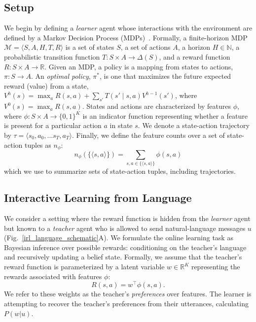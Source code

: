 \documentclass[letterpaper]{article} %
\begin{document}
\subsection{Setup}
We begin by defining a \emph{learner} agent whose interactions with the environment are defined by a Markov Decision Process (MDPs)~\cite{puterman1994markov}.
Formally, a finite-horizon MDP $\mathcal{M} = \langle S, A, H, T, R \rangle$ is a set of states $S$, a set of actions $A$, a horizon $H \in \mathbb{N}$, a probabilistic transition function $T: S \times A \rightarrow \Delta(S)$, and a reward function $R: S \times A \rightarrow \mathbb{R}$. Given an MDP, a policy is a mapping from states to actions, $\pi: S \rightarrow A$.
An \emph{optimal policy}, $\pi^*$, is one that maximizes the future expected reward (value) from a state, $V^h(s) = \max_a R(s, a) + \sum_{s'} T(s' \mid s, a) V^{h - 1}(s')$, where $V^0(s) = \max_a R(s, a)$.
States and actions are characterized by features $\phi$, where $\phi: S \times A \rightarrow \{0, 1\}^{K}$ is an indicator function representing whether a feature is present for a particular action $a$ in state $s$.
We denote a state-action trajectory by $\tau = \langle s_0, a_0, ... s_T, a_T \rangle$. Finally, we define the feature counts over a set of state-action tuples as $n_\phi$:
\begin{equation}
    n_\phi(\{\langle s,a\rangle\}) = \sum_{s,a\in\{\langle s,a\rangle\}}\phi(s,a)
\end{equation}
which we use to summarize sets of state-action tuples, including trajectories.

\subsection{Interactive Learning from Language}
\label{bayesian_lr_section}
We consider a setting where the reward function is hidden from the \emph{learner} agent but known to a \emph{teacher} agent who is allowed to send natural-language messages $u$ (Fig.~\ref{irl_language_schematic}A).
We formulate the online learning task as Bayesian inference over possible rewards: conditioning on the teacher's language and recursively updating a belief state.
Formally, we assume that the teacher's reward function is parameterized by a latent variable $w \in \mathbb{R}^K$ representing the rewards associated with features $\phi$:
\begin{equation}
    R(s,a) = w^{\top}\phi(s, a).
\end{equation}
We refer to these weights as the teacher's \textit{preferences} over features.
The learner is attempting to recover the teacher's preferences from their utterances, calculating $P(w | u)$.
\end{document}
